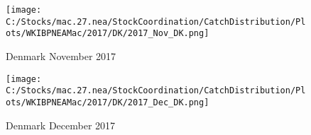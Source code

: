 \documentclass{article}
\begin{document}
\begin{figure}
	\centering
		\texttt{[image: C:/Stocks/mac.27.nea/StockCoordination/CatchDistribution/Plots/WKIBPNEAMac/2017/DK/2017\_Nov\_DK.png]}
	\caption{Denmark November 2017}
	\label{fig:2017_Nov_DK}
\end{figure}

\begin{figure}
	\centering
		\texttt{[image: C:/Stocks/mac.27.nea/StockCoordination/CatchDistribution/Plots/WKIBPNEAMac/2017/DK/2017\_Dec\_DK.png]}
	\caption{Denmark December 2017}
	\label{fig:2017_Dec_DK}
\end{figure}
\end{document}
